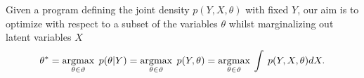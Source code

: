 
Given a program defining the joint density $p(Y, X, \theta)$ with fixed $Y$, our aim is to optimize with respect to a subset of the variables $\theta$ whilst marginalizing out latent variables $X$
\begin{equation}
\label{eq:MMAP}
\theta^* = \operatorname*{arg\,\!max}_{\theta \in \vartheta} \; p(\theta | Y) = \operatorname*{arg\,\!max}_{\theta \in \vartheta} \; p(Y, \theta) = \operatorname*{arg\,\!max}_{\theta \in \vartheta} \: \int \: p(Y, X, \theta) dX.
\end{equation}

